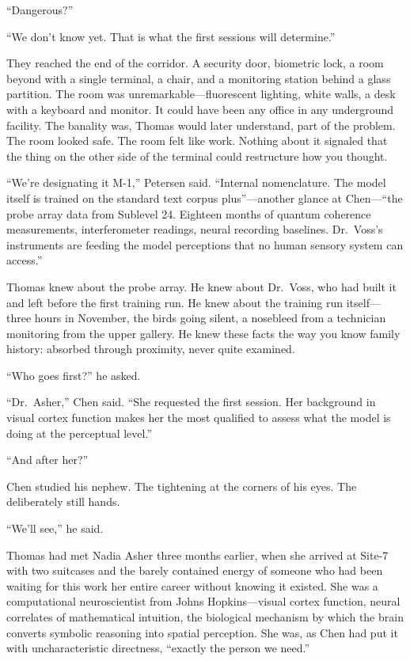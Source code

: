 ``Dangerous?''

``We don't know yet. That is what the first sessions will determine.''

They reached the end of the corridor. A security door, biometric lock, a room beyond with a single terminal, a chair, and a monitoring station behind a glass partition. The room was unremarkable---fluorescent lighting, white walls, a desk with a keyboard and monitor. It could have been any office in any underground facility. The banality was, Thomas would later understand, part of the problem. The room looked safe. The room felt like work. Nothing about it signaled that the thing on the other side of the terminal could restructure how you thought.

``We're designating it M-1,'' Petersen said. ``Internal nomenclature. The model itself is trained on the standard text corpus plus''---another glance at Chen---``the probe array data from Sublevel 24. Eighteen months of quantum coherence measurements, interferometer readings, neural recording baselines. Dr.\ Voss's instruments are feeding the model perceptions that no human sensory system can access.''

Thomas knew about the probe array. He knew about Dr.\ Voss, who had built it and left before the first training run. He knew about the training run itself---three hours in November, the birds going silent, a nosebleed from a technician monitoring from the upper gallery. He knew these facts the way you know family history: absorbed through proximity, never quite examined.

``Who goes first?'' he asked.

``Dr.\ Asher,'' Chen said. ``She requested the first session. Her background in visual cortex function makes her the most qualified to assess what the model is doing at the perceptual level.''

``And after her?''

Chen studied his nephew. The tightening at the corners of his eyes. The deliberately still hands.

``We'll see,'' he said.

\scenebreak

Thomas had met Nadia Asher three months earlier, when she arrived at Site-7 with two suitcases and the barely contained energy of someone who had been waiting for this work her entire career without knowing it existed. She was a computational neuroscientist from Johns Hopkins---visual cortex function, neural correlates of mathematical intuition, the biological mechanism by which the brain converts symbolic reasoning into spatial perception. She was, as Chen had put it with uncharacteristic directness, ``exactly the person we need.''

